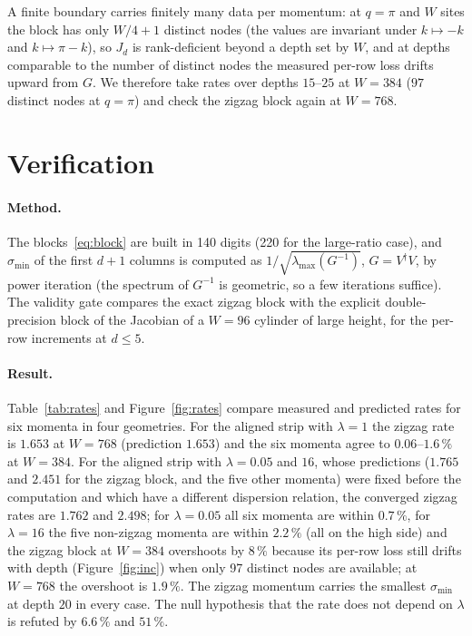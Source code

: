 \documentclass[11pt,a4paper]{article}
\begin{document}
A finite boundary carries finitely many data per momentum: at $q=\pi$ and $W$ sites the block has only $W/4+1$ distinct nodes
(the values are invariant under $k\mapsto-k$ and $k\mapsto\pi-k$), so $J_d$ is rank-deficient beyond a depth set by $W$, and
at depths comparable to the number of distinct nodes the measured per-row loss drifts upward from $G$. We therefore take rates
over depths $15$--$25$ at $W=384$ ($97$ distinct nodes at $q=\pi$) and check the zigzag block again at $W=768$.

\section{Verification}\label{sec:verify}
\paragraph{Method.} The blocks~\eqref{eq:block} are built in 140 digits (220 for the large-ratio case), and
$\sigma_{\min}$ of the first $d+1$ columns is computed as $1/\sqrt{\lambda_{\max}(G^{-1})}$, $G=V^{\dagger}V$, by power iteration
(the spectrum of $G^{-1}$ is geometric, so a few iterations suffice). The validity gate compares the exact zigzag block with the
explicit double-precision block of the Jacobian of a $W=96$ cylinder of large height, for the per-row increments at $d\le5$.

\paragraph{Result.} Table~\ref{tab:rates} and Figure~\ref{fig:rates} compare measured and predicted rates for six momenta in
four geometries. For the aligned strip with $\lambda=1$ the zigzag rate is $1.653$ at $W=768$ (prediction $1.653$) and the six
momenta agree to $0.06$--$1.6\,\%$ at $W=384$. For the aligned strip with $\lambda=0.05$ and $16$, whose predictions
($1.765$ and $2.451$ for the zigzag block, and the five other momenta) were fixed before the computation and which have a
different dispersion relation, the converged zigzag rates are $1.762$ and $2.498$; for $\lambda=0.05$ all six momenta are
within $0.7\,\%$, for $\lambda=16$ the five non-zigzag momenta are within $2.2\,\%$ (all on the high side) and the zigzag block at
$W=384$ overshoots by $8\,\%$ because its per-row loss still drifts with depth (Figure~\ref{fig:inc}) when only 97 distinct nodes
are available; at $W=768$ the overshoot is $1.9\,\%$. The zigzag momentum carries the smallest $\sigma_{\min}$ at depth $20$ in
every case. The null hypothesis that the rate does not depend on $\lambda$ is refuted by $6.6\,\%$ and $51\,\%$.
\end{document}
